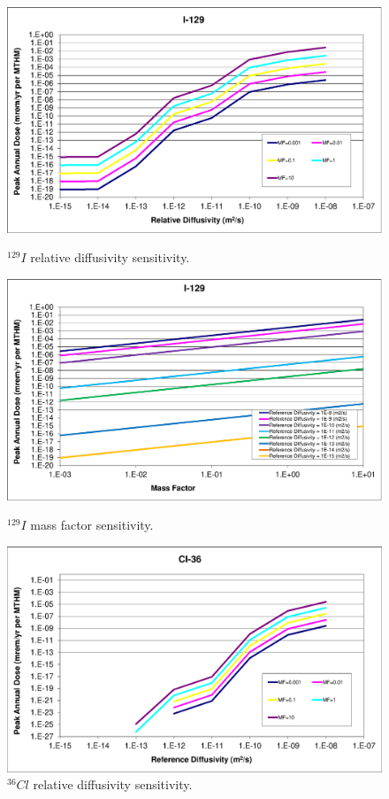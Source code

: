 \begin{figure}[ht]
\centering
\begin{minipage}[b]{0.45\linewidth}

\includegraphics[width=\linewidth]{./chapters/nuclide_sensitivity/clay/DiffCoeffAndInvEBSFail/I-129.eps}
\caption{$^{129}I$ relative diffusivity sensitivity.}
\label{fig:DCInvI129}

\includegraphics[width=\linewidth]{./chapters/nuclide_sensitivity/clay/DiffCoeffAndInvEBSFail/I-129-MF.eps}
\caption{$^{129}I$ mass factor sensitivity.}
\label{fig:DCInvI129MF}

\end{minipage}
\hspace{0.05\linewidth}
\begin{minipage}[b]{0.45\linewidth}

\includegraphics[width=\linewidth]{./chapters/nuclide_sensitivity/clay/DiffCoeffAndInvEBSFail/Cl-36.eps}
\caption{$^{36}Cl$ relative diffusivity sensitivity.}
\label{fig:DCInvCl36}


\end{minipage}
\end{figure}
